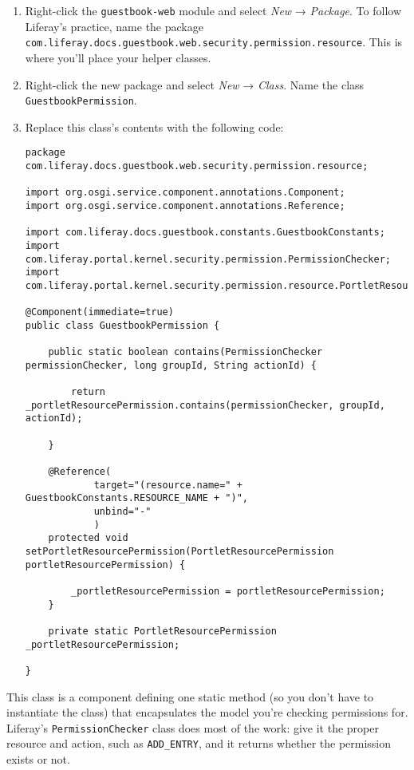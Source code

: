 \begin{enumerate}
\def\labelenumi{\arabic{enumi}.}
\item
  Right-click the \texttt{guestbook-web} module and select \emph{New} →
  \emph{Package}. To follow Liferay's practice, name the package
  \texttt{com.liferay.docs.guestbook.web.security.permission.resource}.
  This is where you'll place your helper classes.
\item
  Right-click the new package and select \emph{New} → \emph{Class}. Name
  the class \texttt{GuestbookPermission}.
\item
  Replace this class's contents with the following code:

\begin{verbatim}
package com.liferay.docs.guestbook.web.security.permission.resource;

import org.osgi.service.component.annotations.Component;
import org.osgi.service.component.annotations.Reference;

import com.liferay.docs.guestbook.constants.GuestbookConstants;
import com.liferay.portal.kernel.security.permission.PermissionChecker;
import com.liferay.portal.kernel.security.permission.resource.PortletResourcePermission;

@Component(immediate=true)
public class GuestbookPermission {

    public static boolean contains(PermissionChecker permissionChecker, long groupId, String actionId) {

        return _portletResourcePermission.contains(permissionChecker, groupId, actionId);

    }

    @Reference(
            target="(resource.name=" + GuestbookConstants.RESOURCE_NAME + ")",
            unbind="-"
            )
    protected void setPortletResourcePermission(PortletResourcePermission portletResourcePermission) {

        _portletResourcePermission = portletResourcePermission;
    }

    private static PortletResourcePermission _portletResourcePermission;

}
\end{verbatim}
\end{enumerate}

This class is a component defining one static method (so you don't have
to instantiate the class) that encapsulates the model you're checking
permissions for. Liferay's \texttt{PermissionChecker} class does most of
the work: give it the proper resource and action, such as
\texttt{ADD\_ENTRY}, and it returns whether the permission exists or
not.


